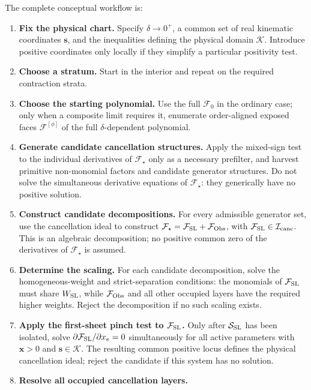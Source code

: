 \documentclass[a4paper,11pt]{article}
\newcommand{\x}{\boldsymbol{x}}
\newcommand{\s}{\boldsymbol{s}}
\newcommand{\K}{\mathcal K}
\newcommand{\FSL}{\mathcal F_{\rm SL}}
\newcommand{\SSL}{\mathcal S_{\rm SL}}
\newcommand{\FObs}{\mathcal F_{\rm Obs}}
\newcommand{\WSL}{W_{\rm SL}}
\begin{document}
The complete conceptual workflow is:
\begin{enumerate}[label=\textbf{\arabic*.},leftmargin=*]
\item \textbf{Fix the physical chart.}
      Specify \(\delta\to0^+\), a common set of real kinematic coordinates
      \(\s\), and the inequalities defining the physical domain \(\K\).
      Introduce positive coordinates only locally if they simplify a
      particular positivity test.
\item \textbf{Choose a stratum.}
      Start in the interior and repeat on the required contraction strata.
\item \textbf{Choose the starting polynomial.}
      Use the full \(\mathcal F_0\) in the ordinary case; only when a composite
      limit requires it, enumerate
      order-aligned exposed faces \(\mathcal F^{[\phi]}\) of the full
      \(\delta\)-dependent polynomial.
\item \textbf{Generate candidate cancellation structures.}
      Apply the mixed-sign test to the individual derivatives of
      \(\mathcal F_\star\) only as a necessary prefilter, and harvest
      primitive non-monomial factors and candidate generator structures.
      Do not solve the simultaneous derivative equations of
      \(\mathcal F_\star\): they generically have no positive solution.
\item \textbf{Construct candidate decompositions.}
      For every admissible generator set, use the cancellation ideal to
      construct \(\mathcal F_\star=\FSL+\FObs\), with
      \(\FSL\in\mathcal I_{\rm canc}\).  This is an algebraic decomposition;
      no positive common zero of the derivatives of \(\mathcal F_\star\) is
      assumed.
\item \textbf{Determine the scaling.}
      For each candidate decomposition, solve the homogeneous-weight and
      strict-separation conditions: the monomials of \(\FSL\) must share
      \(\WSL\), while \(\FObs\) and all other occupied layers have the required
      higher weights.  Reject the decomposition if no such scaling exists.
\item \textbf{Apply the first-sheet pinch test to \(\FSL\).}
      Only after \(\SSL\) has been isolated, solve
      \(\partial\FSL/\partial x_e=0\) simultaneously for all active
      parameters with \(\x>0\) and \(\s\in\K\).  The resulting common
      positive locus defines the physical cancellation ideal; reject the
      candidate if this system has no solution.
\item \textbf{Resolve all occupied cancellation layers.}

\end{enumerate}
\end{document}
